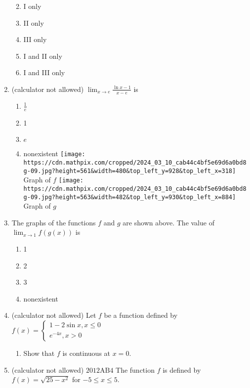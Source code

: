 \documentclass[
]{article}
\providecommand{\tightlist}{%
  \setlength{\itemsep}{0pt}\setlength{\parskip}{0pt}}
\begin{document}
\begin{enumerate}
  \begin{enumerate}
  \def\labelenumii{(\alph{enumii})}
  \tightlist
  \item
    I only
  \item
    II only
  \item
    III only
  \item
    I and II only
  \item
    I and III only
  \end{enumerate}
\item
  (calculator not allowed)
  \(\lim _{x \rightarrow e} \frac{\ln x-1}{x-e}\) is

  \begin{enumerate}
  \def\labelenumii{(\alph{enumii})}
  \tightlist
  \item
    \(\frac{1}{e}\)
  \item
    1
  \item
    \(e\)
  \item
    nonexistent
    \texttt{[image: https://cdn.mathpix.com/cropped/2024\_03\_10\_cab44c4bf5e69d6a0bd8g-09.jpg?height=561\&width=480\&top\_left\_y=928\&top\_left\_x=318]}
    Graph of \(f\)
    \texttt{[image: https://cdn.mathpix.com/cropped/2024\_03\_10\_cab44c4bf5e69d6a0bd8g-09.jpg?height=563\&width=482\&top\_left\_y=930\&top\_left\_x=884]}
    Graph of \(g\)
  \end{enumerate}
\item
  The graphs of the functions \(f\) and \(g\) are shown above. The value
  of \(\lim _{x \rightarrow 1} f(g(x))\) is

  \begin{enumerate}
  \def\labelenumii{(\alph{enumii})}
  \tightlist
  \item
    1
  \item
    2
  \item
    3
  \item
    nonexistent
  \end{enumerate}
\item
  (calculator not allowed) Let \(f\) be a function defined by
  \(f(x)=\left\{\begin{array}{l}1-2 \sin x, x \leq 0 \\ e^{-4 x}, x>0\end{array}\right.\)

  \begin{enumerate}
  \def\labelenumii{(\alph{enumii})}
  \tightlist
  \item
    Show that \(f\) is continuous at \(x=0\).
  \end{enumerate}
\item
  (calculator not allowed) \(2012 \mathrm{AB} 4\) The function \(f\) is
  defined by \(f(x)=\sqrt{25-x^{2}}\) for \(-5 \leq x \leq 5\).


\end{enumerate}
\end{document}
